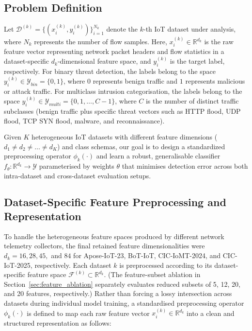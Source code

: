 \documentclass[a4paper,fleqn]{cas-sc}
\begin{document}
\subsection{Problem Definition}

Let $\mathcal{D}^{(k)} = \{(x_i^{(k)}, y_i^{(k)})\}_{i=1}^{N_k}$ denote the $k$-th IoT dataset under analysis, where $N_k$ represents the number of flow samples. Here, $x_i^{(k)} \in \mathbb{R}^{d_k}$ is the raw feature vector representing network packet headers and flow statistics in a dataset-specific $d_k$-dimensional feature space, and $y_i^{(k)}$ is the target label, respectively. For binary threat detection, the labels belong to the space $y_i^{(k)} \in \mathcal{Y}_{bin} = \{0, 1\}$, where $0$ represents benign traffic and $1$ represents malicious or attack traffic. For multiclass intrusion categorisation, the labels belong to the space $y_i^{(k)} \in \mathcal{Y}_{multi} = \{0, 1, \dots, C-1\}$, where $C$ is the number of distinct traffic subclasses (benign traffic plus specific threat vectors such as HTTP flood, UDP flood, TCP SYN flood, malware, and reconnaissance).

Given $K$ heterogeneous IoT datasets with different feature dimensions ($d_1 \neq d_2 \neq \dots \neq d_K$) and class schemas, our goal is to design a standardized preprocessing operator $\phi_k(\cdot)$ and learn a robust, generalisable classifier $f_\theta: \mathbb{R}^{d_k} \rightarrow \mathcal{Y}$ parameterised by weights $\theta$ that minimises detection error across both intra-dataset and cross-dataset evaluation setups.

\subsection{Dataset-Specific Feature Preprocessing and Representation}

To handle the heterogeneous feature spaces produced by different network telemetry collectors, the final retained feature dimensionalities were $d_k = 16, 28, 45,$ and $84$ for Apose-IoT-23, BoT-IoT, CIC-IoMT-2024, and CIC-IoT-2025, respectively. Each dataset $k$ is preprocessed according to its dataset-specific feature space $\mathcal{F}^{(k)} \subset \mathbb{R}^{d_k}$. (The feature-subset ablation in Section~\ref{sec:feature_ablation} separately evaluates reduced subsets of 5, 12, 20, and 20 features, respectively.) Rather than forcing a lossy intersection across datasets during individual model training, a standardised preprocessing operator $\phi_k(\cdot)$ is defined to map each raw feature vector $x_i^{(k)} \in \mathbb{R}^{d_k}$ into a clean and structured representation as follows:
\end{document}
